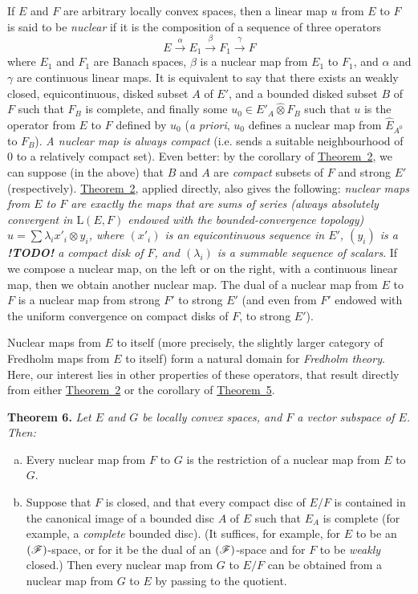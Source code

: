\documentclass{article}
\theoremstyle{plain}
\newenvironment{itenv}[1]
  {\phantomsection\par\medskip\noindent\textbf{#1.}\itshape}
  {\medskip}
\newcommand{\LL}{\mathrm{L}}
\newcommand{\FF}{\mbox{\normalfont($\mathscr{F}$)}}
\newcommand{\hotimes}{\widehat{\otimes}}
\newcommand{\todo}{\textbf{ !TODO! }}
\newcommand{\oldpage}[1]{\marginpar{\footnotesize$\Big\vert$ \textit{p.~#1}}}
\begin{document}
If $E$ and $F$ are arbitrary locally convex spaces, then a linear map $u$ from $E$ to $F$ is said to be \emph{nuclear} if it is the composition of a sequence of three operators
\[
  E \xrightarrow{\alpha} E_1 \xrightarrow{\beta} F_1 \xrightarrow{\gamma} F
\]
where $E_1$ and $F_1$ are Banach spaces, $\beta$ is a nuclear map from $E_1$ to $F_1$, and $\alpha$ and $\gamma$ are continuous linear maps.
It is
\oldpage{86}
equivalent to say that there exists an weakly closed, equicontinuous, disked subset $A$ of $E'$, and a bounded disked subset $B$ of $F$ such that $F_B$ is complete, and finally some $u_0\in E'_A\hotimes F_B$ such that $u$ is the operator from $E$ to $F$ defined by $u_0$ (\emph{a priori}, $u_0$ defines a nuclear map from $\widehat{E}_{A^0}$ to $F_B$).
\emph{A nuclear map is always compact} (i.e. sends a suitable neighbourhood of $0$ to a relatively compact set).
Even better: by the corollary of \hyperref[1.theorem2]{Theorem~2}, we can suppose (in the above) that $B$ and $A$ are \emph{compact} subsets of $F$ and strong $E'$ (respectively).
\hyperref[1.theorem2]{Theorem~2}, applied directly, also gives the following: \emph{nuclear maps from $E$ to $F$ are exactly the maps that are sums of series (always absolutely convergent in $\LL(E,F)$ endowed with the bounded-convergence topology) $u=\sum\lambda_i x'_i\otimes y_i$, where $(x'_i)$ is an equicontinuous sequence in $E'$, $(y_i)$ is a \todo a compact disk of $F$, and $(\lambda_i)$ is a summable sequence of scalars}.
If we compose a nuclear map, on the left or on the right, with a continuous linear map, then we obtain another nuclear map.
The dual of a nuclear map from $E$ to $F$ is a nuclear map from strong $F'$ to strong $E'$ (and even from $F'$ endowed with the uniform convergence on compact disks of $F$, to strong $E'$).

Nuclear maps from $E$ to itself (more precisely, the slightly larger category of Fredholm maps from $E$ to itself) form a natural domain for \emph{Fredholm theory}.
Here, our interest lies in other properties of these operators, that result directly from either \hyperref[1.theorem2]{Theorem~2} or the corollary of \hyperref[1.theorem5]{Theorem~5}.

\begin{itenv}{Theorem 6}
\label{1.theorem6}
  Let $E$ and $G$ be locally convex spaces, and $F$ a vector subspace of $E$.
  Then:
  \begin{enumerate}[a)]
    \item Every nuclear map from $F$ to $G$ is the restriction of a nuclear map from $E$ to $G$.
    \item Suppose that $F$ is closed, and that every compact disc of $E/F$ is contained in the canonical image of a bounded disc $A$ of $E$ such that $E_A$ is complete (for example, a \emph{complete} bounded disc).
      (It suffices, for example, for $E$ to be an $\FF$-space, or for it be the dual of an $\FF$-space and for $F$ to be \emph{weakly} closed.)
      Then every nuclear map from $G$ to $E/F$ can be obtained from a nuclear map from $G$ to $E$ by passing to the quotient.
  \end{enumerate}
\end{itenv}
\end{document}
